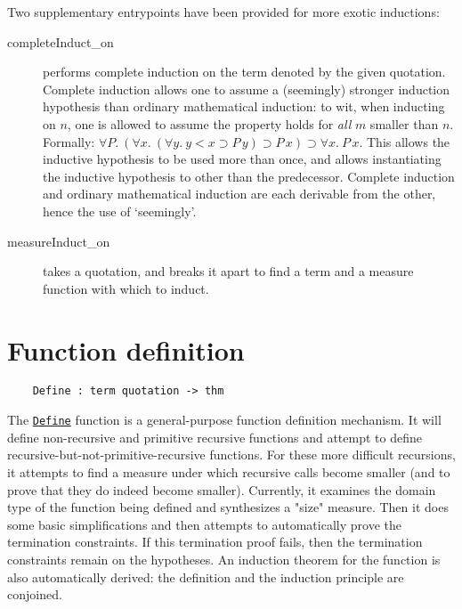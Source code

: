 Two supplementary entrypoints have been provided for more exotic
inductions: 
\begin{description}
\item [completeInduct\_on] performs complete
induction on the term denoted by the given quotation. Complete induction allows one to assume a
(seemingly) stronger induction hypothesis than ordinary mathematical
induction: to wit, when inducting on
$n$, one is allowed to assume the property holds for {\it all\/} $m$
smaller than $n$. Formally: $\forall P.\ (\forall x.\ (\forall y.\ y < x
\supset P\, y) \supset P\,x) \supset \forall x.\ P\,x$. This allows the
inductive hypothesis to be used more than once, and allows instantiating
the inductive hypothesis to other than the predecessor. Complete
induction and ordinary mathematical induction are each derivable from
the other, hence the use of `seemingly'.
\item [measureInduct\_on] takes a quotation, and breaks it apart
to find a term and a measure function with which to induct.
\end{description}

\section{Function definition}

\begin{verbatim}
    Define : term quotation -> thm
\end{verbatim}

The \underline{\tt Define} function is a general-purpose function definition
mechanism. It will define non-recursive and primitive recursive
functions and attempt to define recursive-but-not-primitive-recursive
functions. For these more difficult recursions, it attempts to find a
measure under which recursive calls become smaller (and to prove that
they do indeed become smaller). Currently, it examines the domain type
of the function being defined and synthesizes a "size" measure.  Then it
does some basic simplifications and then attempts to automatically prove
the termination constraints.  If this termination proof fails, then the
termination constraints remain on the hypotheses. An induction theorem
for the function is also automatically derived: the definition and the
induction principle are conjoined. 

